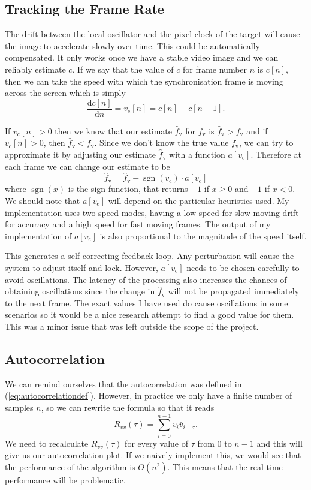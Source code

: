 \documentclass[a4paper,12pt,twoside,openright]{report}
\begin{document}
\subsection{Tracking the Frame Rate}

The drift between the local oscillator and the pixel clock of the target will cause the image to accelerate slowly over time. This could be automatically compensated. It only works once we have a stable video image and we can reliably estimate $c$. If we say that the value of $c$ for frame number $n$ is $c[n]$, then we can take the speed with which the synchronisation frame is moving across the screen which is simply
$$\frac{\text{d} c[n]}{\text{d} n} = v_\text{c}[n] = c[n] - c[n-1] .$$

If $v_\text{c}[n] > 0$ then we know that our estimate  $\hat{f}_\text{v}$ for $f_\text{v}$ is $\hat{f}_\text{v} > f_\text{v}$ and if $v_\text{c}[n] > 0$, then $\hat{f}_\text{v} < f_\text{v}$. Since we don't know the true value $f_\text{v}$, we can try to approximate it by adjusting our estimate $\hat{f}_\text{v}$ with a function $a[v_\text{c}]$. Therefore at each frame we can change our estimate to be
$$\hat{f}_\text{v} = \hat{f}_\text{v} - \operatorname{sgn}(v_\text{c}) \cdot a[v_\text{c}] $$
where $\operatorname{sgn}(x)$ is the sign function, that returns $+1$ if $x \geq 0$ and $-1$ if $x < 0$. We should note that $a[v_\text{c}]$ will depend on the particular heuristics used. My implementation uses two-speed modes, having a low speed for slow moving drift for accuracy and a high speed for fast moving frames. The output of my implementation of $a[v_\text{c}]$ is also proportional to the magnitude of the speed itself.

This generates a self-correcting feedback loop. Any perturbation will cause the system to adjust itself and lock. However, $a[v_\text{c}]$ needs to be chosen carefully to avoid oscillations. The latency of the processing also increases the chances of obtaining oscillations since the change in $\hat{f}_\text{v}$ will not be propagated immediately to the next frame. The exact values I have used do cause oscillations in some scenarios so it would be a nice research attempt to find a good value for them. This was a minor issue that was left outside the scope of the project.

\subsection{Autocorrelation}

We can remind ourselves that the autocorrelation was defined in (\ref{eq:autocorrelationdef}). However, in practice we only have a finite number of samples $n$, so we can rewrite the formula so that it reads
$$R_{vv}(\tau)=\sum\limits_{i=0}^{n-1} v_{i} \bar{v}_{i-\tau} .$$
We need to recalculate $R_{vv}(\tau)$ for every value of $\tau$ from $0$ to $n-1$ and this will give us our autocorrelation plot. If we naively implement this, we would see that the performance of the algorithm is $O(n^2)$. This means that the real-time performance will be problematic.
\end{document}
